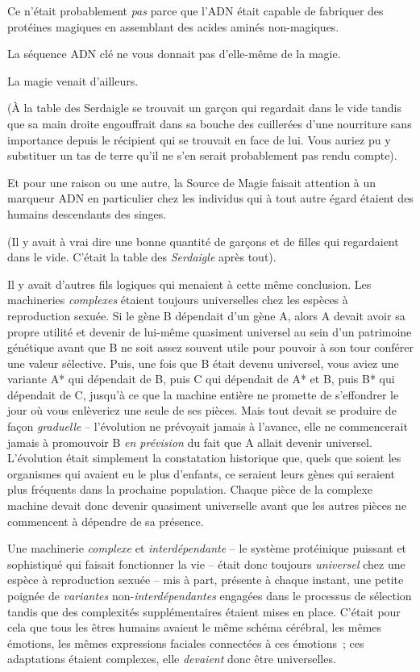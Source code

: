 Ce n'était probablement \emph{pas} parce que l'ADN était capable de fabriquer des protéines magiques en assemblant des acides aminés non-magiques.

La séquence ADN clé ne vous donnait pas d'elle-même de la magie.

La magie venait d'ailleurs.

(À la table des Serdaigle se trouvait un garçon qui regardait dans le vide tandis que sa main droite engouffrait dans sa bouche des cuillerées d'une nourriture sans importance depuis le récipient qui se trouvait en face de lui.
Vous auriez pu y substituer un tas de terre qu'il ne s'en serait probablement pas rendu compte).

Et pour une raison ou une autre, la Source de Magie faisait attention à un marqueur ADN en particulier chez les individus qui à tout autre égard étaient des humains descendants des singes.

(Il y avait à vrai dire une bonne quantité de garçons et de filles qui regardaient dans le vide.
C'était la table des \emph{Serdaigle} après tout).

Il y avait d'autres fils logiques qui menaient à cette même conclusion.
Les machineries \emph{complexes} étaient toujours universelles chez les espèces à reproduction sexuée.
Si le gène B dépendait d'un gène A, alors A devait avoir sa propre utilité et devenir de lui-même quasiment universel au sein d'un patrimoine génétique avant que B ne soit assez souvent utile pour pouvoir à son tour conférer une valeur sélective.
Puis, une fois que B était devenu universel, vous aviez une variante A* qui dépendait de B, puis C qui dépendait de A* et B, puis B* qui dépendait de C, jusqu'à ce que la machine entière ne promette de s'effondrer le jour où vous enlèveriez une seule de ses pièces.
Mais tout devait se produire de façon \emph{graduelle} -- l'évolution ne prévoyait jamais à l'avance, elle ne commencerait jamais à promouvoir B \emph{en prévision} du fait que A allait devenir universel.
L'évolution était simplement la constatation historique que, quels que soient les organismes qui avaient eu le plus d'enfants, ce seraient leurs gènes qui seraient plus fréquents dans la prochaine population.
Chaque pièce de la complexe machine devait donc devenir quasiment universelle avant que les autres pièces ne commencent à dépendre de sa présence.

Une machinerie \emph{complexe} et \emph{interdépendante} -- le système protéinique puissant et sophistiqué qui faisait fonctionner la vie -- était donc toujours \emph{universel} chez une espèce à reproduction sexuée -- mis à part, présente à chaque instant, une petite poignée de \emph{variantes} non-\emph{interdépendantes} engagées dans le processus de sélection tandis que des complexités supplémentaires étaient mises en place.
C'était pour cela que tous les êtres humains avaient le même schéma cérébral, les mêmes émotions, les mêmes expressions faciales connectées à ces émotions~; ces adaptations étaient complexes, elle \emph{devaient} donc être universelles.

